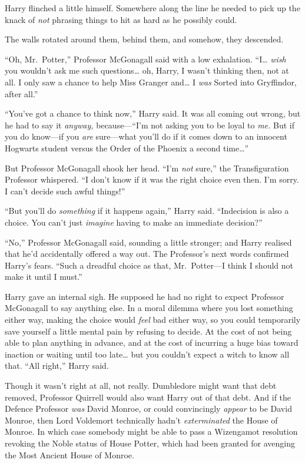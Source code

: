 Harry flinched a little himself. Somewhere along the line he needed to
pick up the knack of \emph{not} phrasing things to hit as hard as he
possibly could.

The walls rotated around them, behind them, and somehow, they descended.

``Oh, Mr.~Potter,'' Professor McGonagall said with a low exhalation.
``I\ldots{} \emph{wish} you wouldn't ask me such questions\ldots{} oh,
Harry, I wasn't thinking then, not at all. I only saw a chance to help
Miss Granger and\ldots{} I \emph{was} Sorted into Gryffindor, after
all.''

``You've got a chance to think now,'' Harry said. It was all coming out
wrong, but he had to say it \emph{anyway,} because---``I'm not asking
you to be loyal to \emph{me.} But if you do know---if you \emph{are}
sure---what you'll do if it comes down to an innocent Hogwarts student
versus the Order of the Phoenix a second time\ldots{}''

But Professor McGonagall shook her head. ``I'm \emph{not} sure,'' the
Transfiguration Professor whispered. ``I don't know if it was the right
choice even then. I'm sorry. I can't decide such awful things!''

``But you'll do \emph{something} if it happens again,'' Harry said.
``Indecision is also a choice. You can't just \emph{imagine} having to
make an immediate decision?''

``No,'' Professor McGonagall said, sounding a little stronger; and Harry
realised that he'd accidentally offered a way out. The Professor's next
words confirmed Harry's fears. ``Such a dreadful choice as that,
Mr.~Potter---I think I should not make it until I must.''

Harry gave an internal sigh. He supposed he had no right to expect
Professor McGonagall to say anything else. In a moral dilemma where you
lost something either way, making the choice would \emph{feel} bad
either way, so you could temporarily save yourself a little mental pain
by refusing to decide. At the cost of not being able to plan anything in
advance, and at the cost of incurring a huge bias toward inaction or
waiting until too late\ldots{} but you couldn't expect a witch to know
all that. ``All right,'' Harry said.

Though it wasn't right at all, not really. Dumbledore might want that
debt removed, Professor Quirrell would also want Harry out of that debt.
And if the Defence Professor \emph{was} David Monroe, or could
convincingly \emph{appear} to be David Monroe, then Lord Voldemort
technically hadn't \emph{exterminated} the House of Monroe. In which
case somebody might be able to pass a Wizengamot resolution revoking the
Noble status of House Potter, which had been granted for avenging the
Most Ancient House of Monroe.

